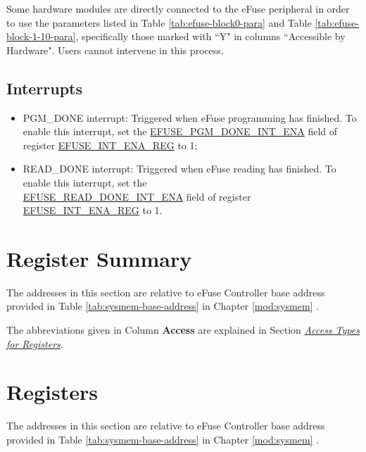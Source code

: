 \documentclass[main\_\_EN.tex]{subfiles}
\begin{document}
Some hardware modules are directly connected to the eFuse peripheral in order to use the parameters listed in Table \ref{tab:efuse-block0-para} and Table \ref{tab:efuse-block-1-10-para}, specifically those marked with ``Y" in columns ``Accessible by Hardware". Users cannot intervene in this process.

\subsection{Interrupts}
\begin{itemize}
\item PGM\_DONE interrupt: Triggered when eFuse programming has finished. To enable this interrupt, set the \hyperref[fielddesc:EFUSEPGMDONEINTENA]{EFUSE\_PGM\_DONE\_INT\_ENA} field of register \hyperref[regdesc:EFUSEINTENAREG]{EFUSE\_INT\_ENA\_REG} to 1;
\item READ\_DONE interrupt: Triggered when eFuse reading has finished. To enable this interrupt, set the \\\hyperref[fielddesc:EFUSEREADDONEINTENA]{EFUSE\_READ\_DONE\_INT\_ENA} field of register \hyperref[regdesc:EFUSEINTENAREG]{EFUSE\_INT\_ENA\_REG} to 1.
\end{itemize}





\clearpage
\section{Register Summary}
\label{sec:efuse-reg-summ}
\hypertarget{efuse-reg-summ}{}

The addresses in this section are relative to eFuse Controller base address provided in Table \ref{tab:sysmem-base-address} in Chapter \ref{mod:sysmem} \textit{}.

The abbreviations given in Column \textbf{Access} are explained in Section \hyperref[glossary-access-types]{\textit{Access Types for Registers}}.






\clearpage
\section{Registers}

The addresses in this section are relative to eFuse Controller base address provided in Table \ref{tab:sysmem-base-address} in Chapter \ref{mod:sysmem} \textit{}.


\end{document}
